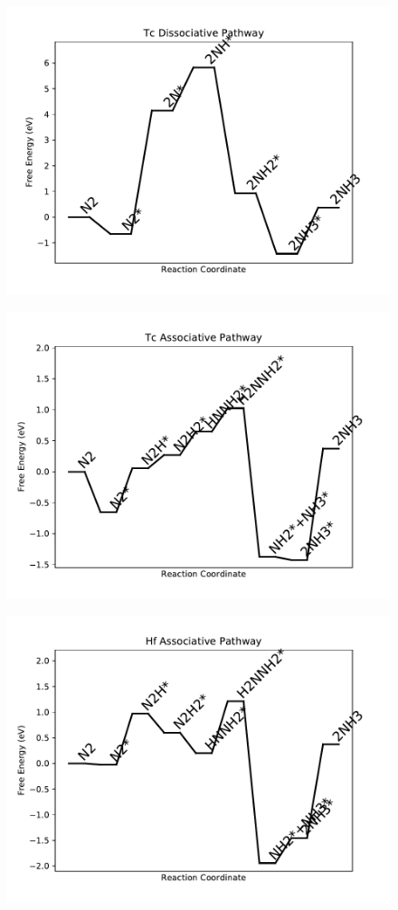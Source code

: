 \begin{figure}
\centering
\includegraphics[width=0.8\linewidth]{data/plots/Tc_dissociative.pdf}
\end{figure}

\begin{figure}
\centering
\includegraphics[width=0.8\linewidth]{data/plots/Tc_associative.pdf}
\end{figure}

\begin{figure}
\centering
\includegraphics[width=0.8\linewidth]{data/plots/Hf_associative.pdf}
\end{figure}


